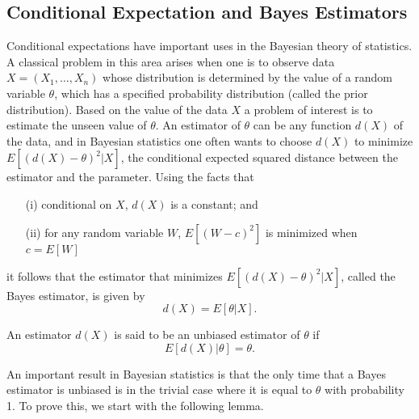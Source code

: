 \documentclass[lang=cn,10pt,thmcnt=section]{elegantbook}
\begin{document}
\subsection{Conditional Expectation and Bayes Estimators}
Conditional expectations have important uses in the Bayesian theory of statistics. A classical problem in this area arises when one is to observe data $X = (X_1, \ldots, X_n)$ whose distribution is determined by the value of a random variable $\theta$, which has a specified probability distribution (called the prior distribution). Based on the value of the data $X$ a problem of interest is to estimate the unseen value of $\theta$. An estimator of $\theta$ can be any function $d(X)$ of the data, and in Bayesian statistics one often wants to choose $d(X)$ to minimize $E[(d(X) - \theta)^2 | X]$, the conditional expected squared distance between the estimator and the parameter. Using the facts that

\begin{itemize}
    \item[(i)] conditional on $X$, $d(X)$ is a constant; and
    \item[(ii)] for any random variable $W$, $E[(W - c)^2]$ is minimized when $c = E[W]$
\end{itemize}
it follows that the estimator that minimizes $E[(d(X) - \theta)^2 | X]$, called the Bayes estimator, is given by
\[
d(X) = E[\theta | X].
\]

An estimator $d(X)$ is said to be an unbiased estimator of $\theta$ if
\[
E[d(X) | \theta] = \theta.
\]

An important result in Bayesian statistics is that the only time that a Bayes estimator is unbiased is in the trivial case where it is equal to $\theta$ with probability 1. To prove this, we start with the following lemma.
\end{document}
